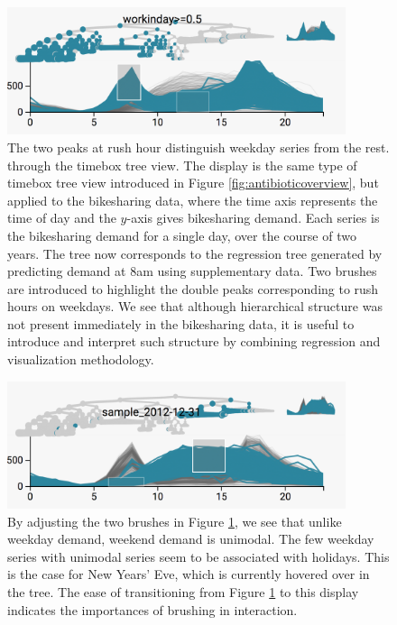 \begin{figure}

{\centering \includegraphics[width=375px]{figure/treelapse/working}

}

\caption{The two peaks at rush hour distinguish weekday series from the rest.
  through the timebox tree view. The display is the same type of timebox tree
  view introduced in Figure \ref{fig:antibioticoverview}, but applied to the
  bikesharing data, where the time axis represents the time of day and the
  $y$-axis gives bikesharing demand. Each series is the bikesharing demand for a
  single day, over the course of two years. The tree now corresponds to the
  regression tree generated by predicting demand at 8am using supplementary
  data. Two brushes are introduced to highlight the double peaks corresponding
  to rush hours on weekdays. We see that although hierarchical structure was not
  present immediately in the bikesharing data, it is useful to introduce and
  interpret such structure by combining regression and visualization
  methodology.
}\label{fig:working}
\end{figure}

\begin{figure}
  \centering
  \includegraphics[width=375px]{figure/treelapse/weekend}
    \caption{By adjusting the two brushes in Figure \ref{fig:working}, we see that
      unlike weekday demand, weekend demand is unimodal. The few weekday series with
      unimodal series seem to be associated with holidays. This is the case for New
      Years' Eve, which is currently hovered over in the tree. The ease of
      transitioning from Figure \ref{fig:working} to this display indicates the
      importances of brushing in interaction.}\label{fig:weekend}
\end{figure}

